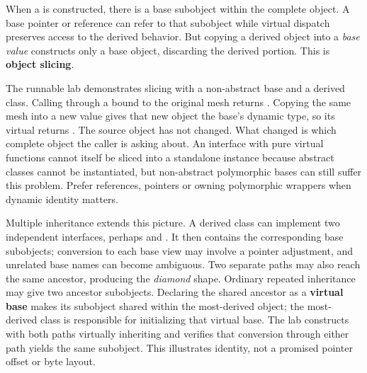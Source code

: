 \hypertarget{01-foundations-i-ch004-a-derived-object-contains-a-base-subobject-not-an-interchangeable-base-value}{}

When a  is constructed, there is a  base subobject within the complete object. A base pointer or reference can refer to that subobject while virtual dispatch preserves access to the derived behavior. But copying a derived object into a \emph{base value} constructs only a base object, discarding the derived portion. This is \textbf{object slicing}.

The runnable lab demonstrates slicing with a non-abstract  base and a  derived class. Calling  through a  bound to the original mesh returns . Copying the same mesh into a new  value gives that new object the base's dynamic type, so its virtual  returns . The source object has not changed. What changed is which complete object the caller is asking about. An interface with pure virtual functions cannot itself be sliced into a standalone instance because abstract classes cannot be instantiated, but non-abstract polymorphic bases can still suffer this problem. Prefer references, pointers or owning polymorphic wrappers when dynamic identity matters.

Multiple inheritance extends this picture. A derived class can implement two independent interfaces, perhaps  and . It then contains the corresponding base subobjects; conversion to each base view may involve a pointer adjustment, and unrelated base names can become ambiguous. Two separate paths may also reach the same ancestor, producing the \emph{diamond} shape. Ordinary repeated inheritance may give two ancestor subobjects. Declaring the shared ancestor as a \textbf{virtual base} makes its subobject shared within the most-derived object; the most-derived class is responsible for initializing that virtual base. The lab constructs  with both paths virtually inheriting  and verifies that conversion through either path yields the same  subobject. This illustrates identity, not a promised pointer offset or byte layout.

